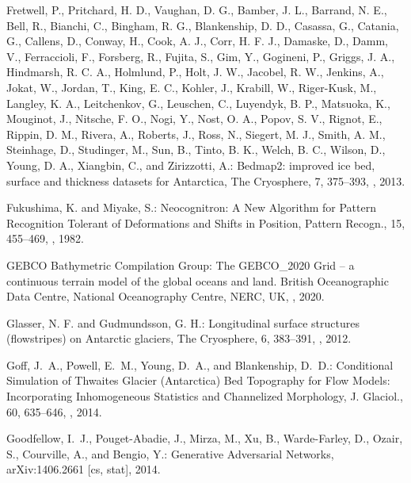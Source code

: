 \documentclass[tc, noline]{copernicus}
\begin{document}
\begin{thebibliography}{95}
Fretwell, P., Pritchard, H. D., Vaughan, D. G., Bamber, J. L., Barrand, N. E., Bell, R., Bianchi, C., Bingham, R. G., Blankenship, D. D., Casassa, G., Catania, G., Callens, D., Conway, H., Cook, A. J., Corr, H. F. J., Damaske, D., Damm, V., Ferraccioli, F., Forsberg, R., Fujita, S., Gim, Y., Gogineni, P., Griggs, J. A., Hindmarsh, R. C. A., Holmlund, P., Holt, J. W., Jacobel, R. W., Jenkins, A., Jokat, W., Jordan, T., King, E. C., Kohler, J., Krabill, W., Riger-Kusk, M., Langley, K. A., Leitchenkov, G., Leuschen, C., Luyendyk, B. P., Matsuoka, K., Mouginot, J., Nitsche, F. O., Nogi, Y., Nost, O. A., Popov, S. V., Rignot, E., Rippin, D. M., Rivera, A., Roberts, J., Ross, N., Siegert, M. J., Smith, A. M., Steinhage, D., Studinger, M., Sun, B., Tinto, B. K., Welch, B. C., Wilson, D., Young, D. A., Xiangbin, C., and Zirizzotti, A.: Bedmap2: improved ice bed, surface and thickness datasets for Antarctica, The Cryosphere, 7, 375--393, , 2013.

Fukushima, K. and Miyake, S.:
Neocognitron: A New Algorithm for Pattern Recognition Tolerant of Deformations and Shifts in Position,
Pattern Recogn.,
15, 455--469, , 1982.


GEBCO Bathymetric Compilation Group: The GEBCO\_2020 Grid -- a continuous terrain model of the global oceans and land. British Oceanographic Data Centre, National Oceanography Centre, NERC, UK, , 2020.

Glasser, N. F. and Gudmundsson, G. H.: Longitudinal surface structures (flowstripes) on Antarctic glaciers, The Cryosphere, 6, 383--391, , 2012.

Goff, J.~A., Powell, E.~M., Young, D.~A., and Blankenship, D.~D.:
Conditional Simulation of Thwaites Glacier (Antarctica) Bed Topography for Flow Models: Incorporating Inhomogeneous Statistics and Channelized Morphology,
J. Glaciol.,
60, 635--646, , 2014.

Goodfellow, I.~J., {Pouget-Abadie}, J., Mirza, M., Xu, B., {Warde-Farley}, D., Ozair, S., Courville, A., and Bengio, Y.:
Generative Adversarial Networks,
arXiv:1406.2661 [cs, stat], 2014.


\end{thebibliography}
\end{document}
